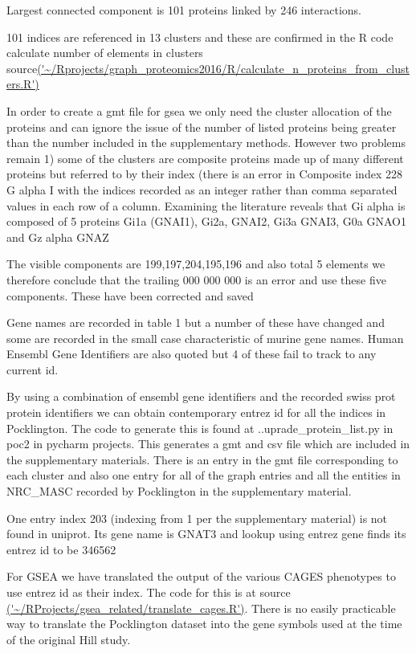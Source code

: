 Largest connected component is 101 proteins linked by 246 interactions. 

101 indices are referenced in 13 clusters and these are confirmed in the R code calculate number of elements in clusters source\url{('~/Rprojects/graph_proteomics2016/R/calculate_n_proteins_from_clusters.R')}

In order to create a gmt file for gsea we only need the cluster allocation of the proteins and can ignore the issue of the number of listed proteins being greater than the number included in the supplementary methods. However two problems remain 1) some of the clusters are composite proteins made up of many different proteins but referred to by their index (there is an error in 
Composite index 228 G alpha I with the indices recorded as an integer rather than comma separated values in each row of a column. Examining the literature reveals that Gi alpha is composed of 5 proteins Gi1a (GNAI1), Gi2a, GNAI2, Gi3a GNAI3, G0a GNAO1 and Gz alpha GNAZ

The visible components are 199,197,204,195,196 and also total 5 elements we therefore conclude that the trailing 000 000 000 is an error and use these five components. These have been corrected and saved

Gene names are recorded in table 1 but a number of these have changed and some are recorded in the small case characteristic of murine gene names. Human Ensembl Gene Identifiers are also quoted but 4 of these fail to track to any current id.

By using a combination of ensembl gene identifiers and the recorded swiss prot protein identifiers we can obtain contemporary entrez id for all the indices in Pocklington. The code to generate this is found at ..uprade\_protein\_list.py in poc2 in pycharm projects.
This generates a gmt and csv file which are included in the supplementary materials. There is an entry in the gmt file corresponding to each cluster and also one entry for all of the graph entries and all the entities in NRC\_MASC recorded by Pocklington in the supplementary material. 

One entry index 203 (indexing from 1 per the supplementary material) is not found in uniprot. Its gene name is GNAT3 and lookup using entrez gene finds its entrez id to be 346562

For GSEA we have translated the output of the various CAGES phenotypes to use entrez id as their index. The code for this is at source \url{('~/RProjects/gsea_related/translate_cages.R')}.
There is no easily practicable way to translate the Pocklington dataset into the gene symbols used at the time of the original Hill study. 

